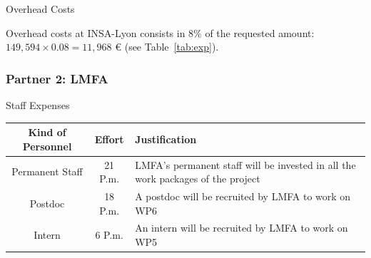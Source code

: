\documentclass[a4paper,9pt]{extarticle}
\newcommand{\secfont}{\noindent\color{ANRblue}\normalfont\sffamily}
\begin{document}
{\secfont Overhead Costs}

\noindent
Overhead costs at INSA-Lyon consists in 8\% of the requested amount: $149,594 \times 0.08 = 11,968$ \euro{} (see Table~\ref{tab:exp}).

\subsubsection{Partner 2: LMFA}

{\secfont Staff Expenses}

\noindent
\begin{center}
\begin{tabular}{c | c | p{10cm}}
\textbf{Kind of Personnel} & \textbf{Effort} & \textbf{Justification}\\
\hline
\hline
Permanent Staff & 21 P.m. & LMFA's permanent staff will be invested in all the work packages of the project\\
Postdoc & 18 P.m. & A postdoc will be recruited by LMFA to work on WP6\\
Intern & 6 P.m. & An intern will be recruited by LMFA to work on WP5
\end{tabular}
\end{center}
\end{document}
